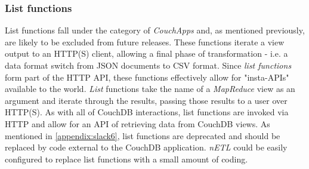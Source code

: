 \subsubsection{List functions}
List functions fall under the category of \textit{CouchApps} and, as mentioned previously, are likely to be excluded from future releases. These functions iterate a view output to an HTTP(S) client, allowing a final phase of transformation - i.e. a data format switch from JSON documents to CSV format. Since \textit{list functions} form part of the HTTP API, these functions effectively allow for "insta-APIs" available to the world. \textit{List} functions take the name of a \textit{MapReduce} view as an argument and iterate through the results, passing those results to a user over HTTP(S). As with all of CouchDB interactions, list functions are invoked via HTTP and allow for an API of retrieving data from CouchDB views. As mentioned in \ref{appendix:slack6}, list functions are deprecated and should be replaced by code external to the CouchDB application. \textit{nETL} could be easily configured to replace list functions with a small amount of coding.
